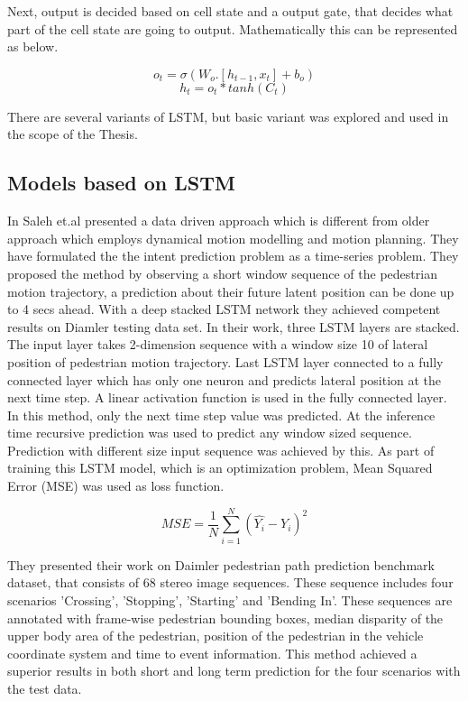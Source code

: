 Next, output is decided based on cell state and a output gate, that decides what part of the cell state are going to output. Mathematically this can be represented as below.

\begin{equation}
o_t = \sigma(W_o. [h_{t-1}, x_t  ] + b_o)
\end{equation}
\begin{equation}
h_t = o_t  * tanh(C_t)
\end{equation}

There are several variants of LSTM, but basic variant was explored and used in the scope of the Thesis.

\subsection{Models based on LSTM }
In \cite{saleh2017intent} Saleh et.al presented a data driven approach which is different from older approach which employs dynamical motion modelling and motion planning. They have formulated the the intent prediction problem as a time-series problem. They proposed the method by observing a short window sequence of the pedestrian motion trajectory, a prediction about their future latent position can be done up to 4 secs ahead. With a deep stacked LSTM network they achieved competent results on Diamler testing data set. In their work, three LSTM layers are stacked. The input layer takes 2-dimension sequence with a window size 10 of lateral position of pedestrian motion trajectory. Last LSTM layer connected to a fully connected layer which has only one neuron and predicts lateral position at the next time step. A linear activation function is used in the fully connected layer. In this method, only the next time step value was predicted. At the inference time recursive prediction was used to predict any window sized sequence. Prediction with different size input sequence was achieved by this.
As part of training this LSTM  model, which is an optimization problem, Mean Squared Error (MSE) was used as loss function.

\begin{equation}
MSE= \frac{1}{N}\sum_{i=1}^{N}(\hat{Y_i} - Y_i)^2
\end{equation}

They presented their work on Daimler pedestrian path prediction benchmark dataset, that consists of 68 stereo image sequences. These sequence includes four scenarios 'Crossing', 'Stopping', 'Starting' and 'Bending In'. These sequences are annotated with frame-wise pedestrian bounding boxes, median disparity of the upper body area of the pedestrian, position of the pedestrian in the vehicle coordinate system and time to event information. This method achieved a superior results in both short and long term prediction for the four scenarios with the test data.



